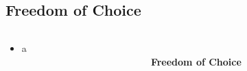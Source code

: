 \documentclass[
    ngerman,
    accentcolor=3b,
    dark_mode,
    fontsize= 12pt,
    a4paper,
    aspectratio=169,
    colorback=true,
    fancy_row_colors,
    leqno,
    fleqn,
    boxarc=3pt,
    fleqn,
]{algoslides}
\begin{document}
    \subsection{Freedom of Choice}
    \begin{frame}[c]
        \slidehead{}
        \begin{columns}
            \begin{column}[c]{0.5\textwidth}
                \begin{itemize}
                    \item a
                \end{itemize}
            \end{column}
            \begin{column}[c]{0.5\textwidth}
                \begin{center}
                    \fontsize{50pt}{0pt}\selectfont\faMagic{}\\[0.2cm]
                    \normalsize\textbf{Freedom of Choice}
                \end{center}
            \end{column}
        \end{columns}
    \end{frame}
\end{document}
